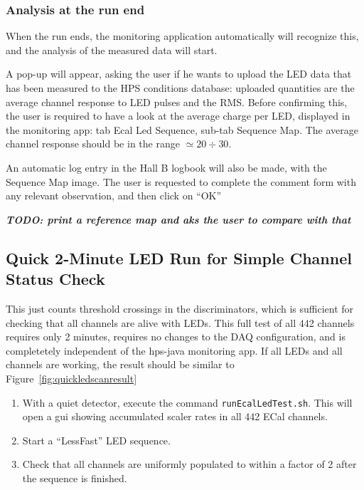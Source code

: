 \documentclass[12pt]{article}
\begin{document}
\subsubsection{Analysis at the run end}

When the run ends, the monitoring application automatically will recognize this, and the analysis of the measured data will start. 

A pop-up will appear, asking the user if he wants to upload the LED data that has been measured to the HPS conditions database: uploaded quantities are the average channel response to LED pulses and the RMS. Before confirming this, the user is required to have a look at the average charge per LED, displayed in the monitoring app: tab Ecal Led Sequence, sub-tab Sequence Map. The average channel response should be in the range $\simeq 20 \div 30$. 

An automatic log entry in the Hall B logbook will also be made, with the Sequence Map image. The user is requested to complete the comment form with any relevant observation, and then click on ``OK''

{\bf {\it TODO: print a reference map and aks the user to compare with that}}

\subsection{Quick 2-Minute LED Run for Simple Channel Status Check}
This just counts threshold crossings in the discriminators, which is sufficient for checking that all channels are alive with LEDs.  This full test of all 442 channels requires only 2 minutes, requires no changes to the DAQ configuration, and is completetely independent of the hps-java monitoring app.  If all LEDs and all channels are working, the result should be similar to Figure~\ref{fig:quickledscanresult}

  \begin{enumerate}
      \item With a quiet detector, execute the command \texttt{runEcalLedTest.sh}.  This will open a gui showing accumulated scaler rates in all 442 ECal channels.  
      \item Start a ``LessFast'' LED sequence.
      \item Check that all channels are uniformly populated to within a factor of 2 after the sequence is finished.
  \end{enumerate}
\end{document}
